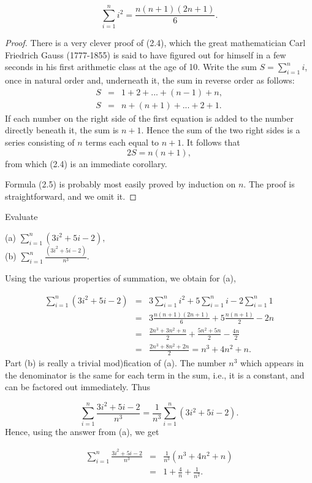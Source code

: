\begin{theorem} %
$$
\sum_{i = 1}^{n} i^2 = \frac{n(n+1)(2n + 1)}{6}.
$$
\end{theorem}

\begin{proof}
There is a very clever proof of (2.4), which the great mathematician Carl Friedrich Gauss (1777-1855) is said to have figured out for himself in a few seconds in his first arithmetic class at the age of 10. Write the sum $S =\sum_{i = 1}^{n} i$, once in natural order and, underneath it, the sum in reverse order as follows:  
\begin{eqnarray*}
S &=& 1 + 2 + ... + (n - 1) + n,\\
S &=& n + (n + 1) + ... + 2 + 1.
\end{eqnarray*}
If each number on the right side of the first equation is added to the number directly beneath it, the sum is $n + 1$. Hence the sum of the two right sides is a series consisting of $n$ terms each equal to $n + 1$. It follows that
$$
2S = n(n + 1),
$$
from which (2.4) is an immediate corollary.

Formula (2.5) is probably most easily proved by induction on $n$. The proof is straightforward, and we omit it.
\end{proof}

\begin{example} Evaluate  
 
\begin{description}
\item[(a) $\sum_{i = 1}^{n} (3i^2 + 5i - 2),$]
\item[(b) $\sum_{i = 1}^{n} \frac{(3i^2 + 5i -2)}{n^3}.$]
\end{description}
\noindent Using the various properties of summation, we obtain for (a),  

\begin{eqnarray*}
\sum_{i = 1}^n(3i^2 + 5i - 2) &=& 3 \sum_{i = 1}^{n} i^2 + 5\sum_{i = 1}^{n} i - 2 \sum_{i = 1}^{n} 1\\ 
&=& 3 \frac{ n(n + 1)(2n + 1)}{6} + 5 \frac{n(n + 1)}{2} - 2n \\
&=& \frac {2n^3 + 3n^2 + n}{2} + \frac{ 5n^2 + 5n}{2} - \frac{ 4n}{2}  \\
&=& \frac{2n^3 + 8n^2 + 2n}{2} = n^3 + 4n^2 + n.
\end{eqnarray*}
\noindent Part (b) is really a trivial mod)fication of (a). The number $n^3$ which appears in the denominator is the same for each term in the sum, i.e., it is a constant, and can be factored out immediately. Thus

$$
\sum_{i = 1}^n \frac{3i^2 + 5i - 2}{n^3} = \frac{1}{n^3} \sum_{i = 1}^n (3i^2 + 5i - 2).
$$
\noindent Hence, using the answer from (a), we get 

\begin{eqnarray*}
\sum_{i = 1}^n \frac{ 3i^2 + 5i - 2}{n^3} &=& \frac{1}{n^3} (n^3 + 4n^2 + n)\\
                                            &=& 1 + \frac{4}{n} + \frac{1}{n^2}.
\end{eqnarray*}
\end{example}

